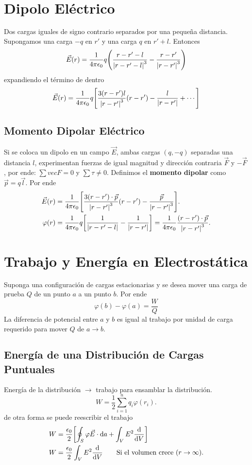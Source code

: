 \section{Dipolo Eléctrico}
Dos cargas iguales de signo contrario separados por una pequeña distancia. Supongamos una carga $-q$ en $r'$ y una carga $q$ en $r' + l$. Entonces
\begin{equation}
	\vec{E} (r) = \frac{1}{4\pi \epsilon_0} q \qty(\frac{r - r' - l}{\abs{r - r' - l}^3} - \frac{r - r'}{\abs{r - r'}^3})
\end{equation}
expandiendo el término de dentro
\begin{equation}
	\vec{E} (r) = \frac{1}{4\pi \epsilon_0} q \qty[\frac{3 (r - r') l}{\abs{r - r'}^3} (r - r') - \frac{l}{\abs{r - r'}} + \cdots]
\end{equation}

\subsection{Momento Dipolar Eléctrico}
Si se coloca un dipolo en un campo $\vec{E}$, ambas cargas $(q,-q)$ separadas una distancia $l$, experimentan fuerzas de igual magnitud y dirección contraria $\vec{F}$ y $-\vec{F}$, por ende: $\sum vec{F} = 0$ y $\sum \tau \neq 0$. Definimos el \textbf{momento dipolar} como $\vec{p} = q\vec{l}$. Por ende
\begin{align}
	\vec{E} (r) &= \frac{1}{4\pi \epsilon_0} \qty[\frac{3(r - r')\cdot \vec{p}}{\abs{r - r'}^3} (r - r') - \frac{\vec{p}}{\abs{r - r'}^3}].	\\
	\varphi (r) &= \frac{1}{4\pi \epsilon_0} q \qty[\frac{1}{\abs{r - r' - l}} - \frac{1}{\abs{r - r'}}] = \frac{1}{4\pi \epsilon_0} \frac{(r - r') \cdot \vec{p}}{\abs{r - r'}^3}.
\end{align}


\section{Trabajo y Energía en Electrostática}
Suponga una configuración de cargas estacionarias y se desea mover una carga de prueba $Q$ de un punto $a$ a un punto $b$. Por ende
\begin{equation}
	\varphi (b) - \varphi (a) = \frac{W}{Q}
\end{equation}
La diferencia de potencial entre $a$ y $b$ es igual al trabajo por unidad de carga requerido para mover $Q$ de $a\to b$.

\subsection{Energía de una Distribución de Cargas Puntuales}
Energía de la distribución $\to$ trabajo para ensamblar la distribución.
\begin{equation}
	W = \frac{1}{2} \sum_{i=1} ^n q_i \varphi (r_i).
\end{equation}
de otra forma se puede reescribir el trabajo
\begin{align}
	W &= \frac{\epsilon_0}{2} \qty[\oint _S \varphi \vec{E} \cdot \dd{a} + \int _V E^2 \dv{V}] \\
	W &= \frac{\epsilon_0}{2} \int _V E^2 \dv{V} \qquad \text{Si el volumen crece } (r\to \infty).
\end{align}





